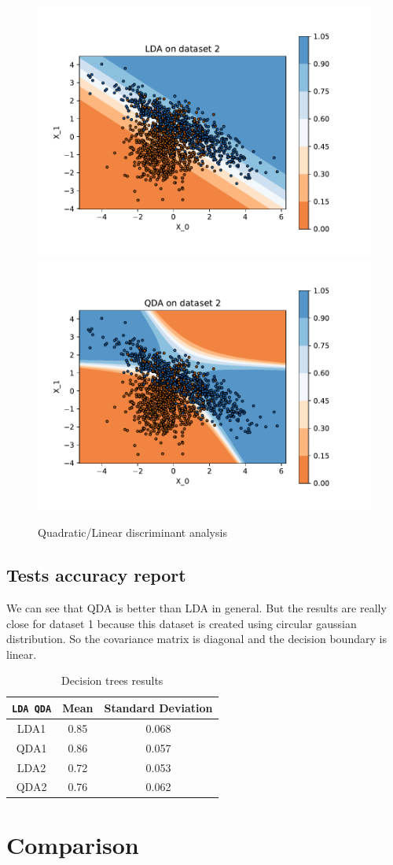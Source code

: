 \documentclass[12pt]{article}
\begin{document}
\begin{figure}[H]
	\centering
	\includegraphics[width=.4\textwidth]{img/lda2.pdf}\quad
	\includegraphics[width=.4\textwidth]{img/qda2.pdf}\quad
	
	\caption{Quadratic/Linear discriminant analysis}
	\label{fig:qdalda}
\end{figure}
\subsection{Tests accuracy report}
We can see that QDA is better than LDA in general. But the results are really close for dataset 1 because this dataset is created using circular gaussian distribution. 
So the covariance matrix is diagonal and the decision boundary is linear.
	\begin{table}[!h]
		\centering
		\begin{tabular}{|c|c|c|}
		\hline
		\verb|LDA QDA|                      & Mean & Standard Deviation \\ \hline
		LDA1                                & 0.85 & 0.068              \\ \hline
		QDA1                                & 0.86 & 0.057              \\ \hline
		LDA2                                & 0.72 & 0.053              \\ \hline
		QDA2                                & 0.76 & 0.062              \\ \hline
		\end{tabular}
		\caption{Decision trees results}
		\label{tab:results-qdalda}
	\end{table}


\section{Comparison}
\end{document}
